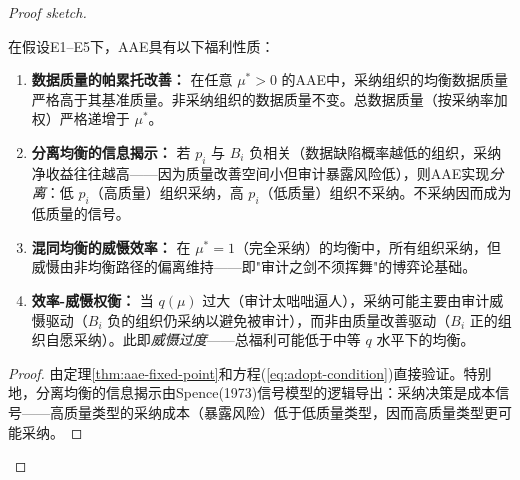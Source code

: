\documentclass[12pt,a4paper]{ctexart}
\theoremstyle{definition}
\theoremstyle{remark}
\begin{document}
\begin{proof}[Proof sketch]
\begin{proposition}[AAE的福利性质]
\label{prop:aae-welfare}
在假设E1--E5下，AAE具有以下福利性质：
\begin{enumerate}[label=(\roman*)]
\item \textbf{数据质量的帕累托改善：} 在任意 $\mu^* > 0$ 的AAE中，采纳组织的均衡数据质量严格高于其基准质量。非采纳组织的数据质量不变。总数据质量（按采纳率加权）严格递增于 $\mu^*$。
\item \textbf{分离均衡的信息揭示：} 若 $p_i$ 与 $B_i$ 负相关（数据缺陷概率越低的组织，采纳净收益往往越高——因为质量改善空间小但审计暴露风险低），则AAE实现\textit{分离}：低 $p_i$（高质量）组织采纳，高 $p_i$（低质量）组织不采纳。不采纳因而成为低质量的信号。
\item \textbf{混同均衡的威慑效率：} 在 $\mu^* = 1$（完全采纳）的均衡中，所有组织采纳，但威慑由非均衡路径的偏离维持——即"审计之剑不须挥舞"的博弈论基础。
\item \textbf{效率-威慑权衡：} 当 $q(\mu)$ 过大（审计太咄咄逼人），采纳可能主要由审计威慑驱动（$B_i$ 负的组织仍采纳以避免被审计），而非由质量改善驱动（$B_i$ 正的组织自愿采纳）。此即\textit{威慑过度}——总福利可能低于中等 $q$ 水平下的均衡。
\end{enumerate}
\end{proposition}

\begin{proof}
由定理\ref{thm:aae-fixed-point}和方程(\ref{eq:adopt-condition})直接验证。特别地，分离均衡的信息揭示由Spence(1973)信号模型的逻辑导出：采纳决策是成本信号——高质量类型的采纳成本（暴露风险）低于低质量类型，因而高质量类型更可能采纳。
\end{proof}


\end{proof}
\end{document}
